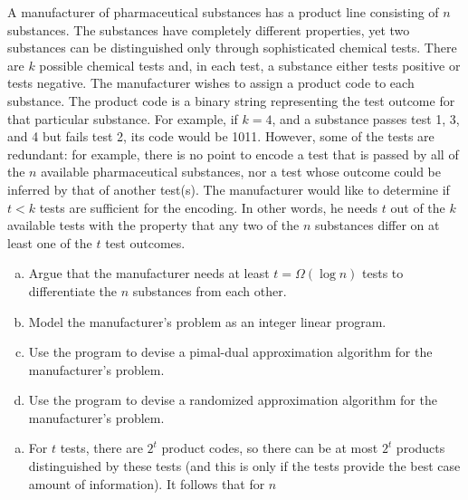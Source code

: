 \documentclass[fleqn]{homework}
\begin{document}
  \maketitle

  \begin{problem}{1}
    \begin{question}
      A manufacturer of pharmaceutical substances has a product line consisting
      of $n$ substances. The substances have completely different properties,
      yet two substances can be distinguished only through sophisticated
      chemical tests. There are $k$ possible chemical tests and, in each test, a
      substance either tests positive or tests negative. The manufacturer wishes
      to assign a product code to each substance. The product code is a binary
      string representing the test outcome for that particular substance. For
      example, if $k=4$, and a substance passes test 1, 3, and 4 but fails test
      2, its code would be 1011.  However, some of the tests are redundant: for
      example, there is no point to encode a test that is passed by all of the
      $n$ available pharmaceutical substances, nor a test whose outcome could be
      inferred by that of another test(s). The manufacturer would like to
      determine if $t<k$ tests are sufficient for the encoding. In other words,
      he needs $t$ out of the $k$ available tests with the property that any two
      of the $n$ substances differ on at least one of the $t$ test outcomes.
      \begin{enumerate}[a.]
      \item Argue that the manufacturer needs at least $t=\Omega(\log n)$ tests
        to differentiate the $n$ substances from each other.
      \item Model the manufacturer's problem as an integer linear program.
      \item Use the program to devise a pimal-dual approximation algorithm for
        the manufacturer's problem.
      \item Use the program to devise a randomized approximation algorithm for
        the manufacturer's problem.
      \end{enumerate}
    \end{question}
    \begin{enumerate}[a.]
    \item For $t$ tests, there are $2^t$ product codes, so there can be at most
      $2^t$ products distinguished by these tests (and this is only if the tests
      provide the best case amount of information).  It follows that for $n$

\end{enumerate}
\end{problem}
\end{document}
